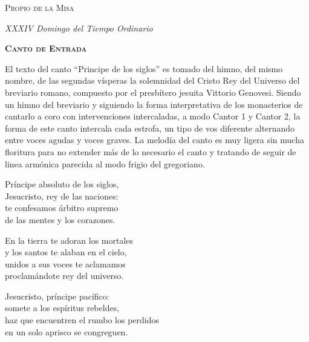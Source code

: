 \documentclass[12pt, letterpaper]{report}
\begin{document}

    \begin{center}
        \vspace*{8cm}
        { \scshape \Huge Propio de la Misa \par}
        \vspace{1cm}
        { \itshape \Large XXXIV Domingo del Tiempo Ordinario \par}
    \end{center}
    \clearpage

    \begin{center}
        {\scshape \Huge {\bfseries Canto de Entrada}}
    \end{center}

    \Large El texto del canto ``Principe de los siglos'' es tomado del himno, del mismo nombre,
    de las segundas v\'isperas la solemnidad del Cristo Rey del Universo del breviario romano,
    compuesto por el presb\'itero jesuita Vittorio Genovesi. Siendo un himno del breviario y siguiendo
    la forma interpretativa de los monasterios de cantarlo a coro con intervenciones intercaladas,
    a modo Cantor 1 y Cantor 2, la forma de este canto intercala cada estrofa, un tipo de vos
    diferente alternando entre voces agudas y voces graves. La melod\'ia del canto es muy ligera
    sin mucha floritura para no extender m\'as de lo necesario el canto y tratando de seguir de linea
    arm\'onica parecida al modo frigio del gregoriano.

    \noindent
    \LARGE Pr\'incipe absoluto de los siglos,\\
    Jesucristo, rey de las naciones:\\
    te confesamos \'arbitro supremo\\
    de las mentes y los corazones.

    \noindent
    En la tierra te adoran los mortales\\
    y los santos te alaban en el cielo,\\
    unidos a sus voces te aclamamos\\
    proclam\'andote rey del universo.

    \noindent
    Jesucristo, pr\'incipe pac\'ifico:\\
    somete a los esp\'iritus rebeldes,\\
    haz que encuentren el rumbo los perdidos\\
    en un solo aprisco se congreguen.
\end{document}
